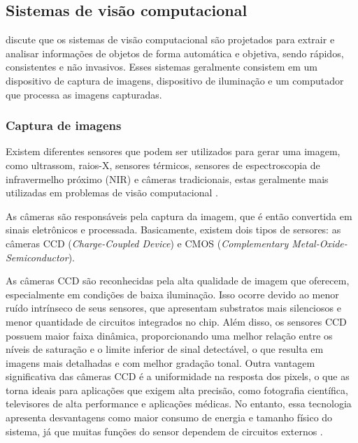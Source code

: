 \subsection{Sistemas de visão computacional}

 discute que os sistemas de visão computacional são projetados para extrair e analisar informações de objetos de forma automática e objetiva, sendo rápidos, consistentes e não invasivos. Esses sistemas geralmente consistem em um dispositivo de captura de imagens, dispositivo de iluminação e um computador que processa as imagens capturadas.

\subsubsection{Captura de imagens}

Existem diferentes sensores que podem ser utilizados para gerar uma imagem, como ultrassom, raios-X, sensores térmicos, sensores de espectroscopia de infravermelho próximo (NIR) e câmeras tradicionais, estas geralmente mais utilizadas em problemas de visão computacional \cite{brosnan2004improving}. 

As câmeras são responsáveis pela captura da imagem, que é então convertida em sinais eletrônicos e processada. Basicamente, existem dois tipos de sersores: as câmeras CCD (\textit{Charge-Coupled Device}) e CMOS (\textit{Complementary Metal-Oxide-Semiconductor}).

As câmeras CCD são reconhecidas pela alta qualidade de imagem que oferecem, especialmente em condições de baixa iluminação. Isso ocorre devido ao menor ruído intrínseco de seus sensores, que apresentam substratos mais silenciosos e menor quantidade de circuitos integrados no chip. Além disso, os sensores CCD possuem maior faixa dinâmica, proporcionando uma melhor relação entre os níveis de saturação e o limite inferior de sinal detectável, o que resulta em imagens mais detalhadas e com melhor gradação tonal. Outra vantagem significativa das câmeras CCD é a uniformidade na resposta dos pixels, o que as torna ideais para aplicações que exigem alta precisão, como fotografia científica, televisores de alta performance e aplicações médicas. No entanto, essa tecnologia apresenta desvantagens como maior consumo de energia e tamanho físico do sistema, já que muitas funções do sensor dependem de circuitos externos \cite{littwiller2001ccd_cmos}.

